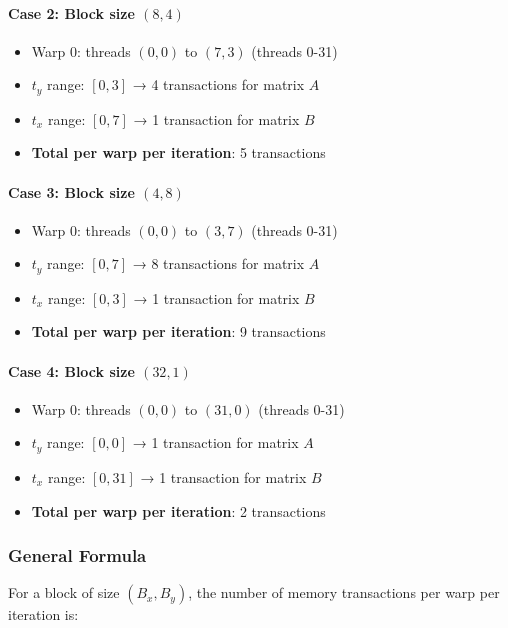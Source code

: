 \documentclass{amsbook}
\theoremstyle{definition}
\begin{document}
\paragraph{Case 2: Block size $(8, 4)$}
\begin{itemize}
\item Warp 0: threads $(0,0)$ to $(7,3)$ (threads 0-31)
\item $t_y$ range: $[0, 3]$ → 4 transactions for matrix $A$
\item $t_x$ range: $[0, 7]$ → 1 transaction for matrix $B$
\item \textbf{Total per warp per iteration}: 5 transactions
\end{itemize}

\paragraph{Case 3: Block size $(4, 8)$}
\begin{itemize}
\item Warp 0: threads $(0,0)$ to $(3,7)$ (threads 0-31)
\item $t_y$ range: $[0, 7]$ → 8 transactions for matrix $A$
\item $t_x$ range: $[0, 3]$ → 1 transaction for matrix $B$
\item \textbf{Total per warp per iteration}: 9 transactions
\end{itemize}

\paragraph{Case 4: Block size $(32, 1)$}
\begin{itemize}
\item Warp 0: threads $(0,0)$ to $(31,0)$ (threads 0-31)
\item $t_y$ range: $[0, 0]$ → 1 transaction for matrix $A$
\item $t_x$ range: $[0, 31]$ → 1 transaction for matrix $B$
\item \textbf{Total per warp per iteration}: 2 transactions
\end{itemize}

\subsubsection{General Formula}

For a block of size $(B_x, B_y)$, the number of memory transactions per warp per iteration is:
\end{document}
